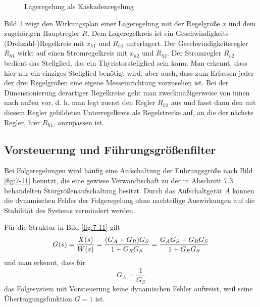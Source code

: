 \begin{figure}[ht]
    \centering
    \caption{Lageregelung als Kaskadenregelung}
    \label{fig:7-10}
\end{figure}

Bild \ref{fig:7-10} zeigt den Wirkungsplan einer Lageregelung mit der Regelgröße \(x\) und dem zugehörigen Hauptregler \(R\).
Dem Lageregelkreis ist ein Geschwindigkeits- (Drehzahl-)Regelkreis mit \(x_{h1}\) und \(R_{h1}\) unterlagert.
Der Geschwindigkeitsregler \(R_{h1}\) wirkt auf einen Stromregelkreis mit \(x_{h2}\) und \(R_{h2}\).
Der Stromregler \(R_{h2}\) bedient das Stellglied, das ein Thyristorstellglied sein kann.
Man erkennt, dass hier nur ein einziges Stellglied benötigt wird, aber auch, dass zum Erfassen jeder der drei Regelgrößen eine eigene Messeinrichtung vorzusehen ist.
Bei der Dimensionierung derartiger Regelkreise geht man zweckmäßigerweise von innen nach außen vor, d. h. man legt zuerst den Regler \(R_{h2}\) aus und fasst dann den mit diesem Regler gebildeten Unterregelkreis als Regelstrecke auf, an die der nächste Regler, hier \(R_{h1}\), anzupassen ist.


\subsection{Vorsteuerung und Führungsgrößenfilter}

Bei Folgeregelungen wird häufig eine Aufschaltung der Führungsgröße nach Bild \ref{fig:7-11} benutzt, die eine gewisse Verwandtschaft zu der in Abschnitt 7.3 behandelten Störgrößenaufschaltung besitzt.
Durch das Aufschaltgerät \(A\) können die dynamischen Fehler der Folgeregelung ohne nachteilige Auswirkungen auf die Stabilität des Systems vermindert werden.

Für die Struktur in Bild \ref{fig:7-11} gilt
\begin{equation}\label{eq:7-5}
    G\parentheses*{s} = \frac{X\parentheses*{s}}{W\parentheses*{s}} = \frac{\parentheses*{G_A + G_R}G_S}{1 + G_R G_S} = \frac{G_A G_S + G_R G_S}{1 + G_R G_S}
\end{equation}
und man erkennt, dass für
\begin{equation}
    G_A = \frac{1}{G_S}
\end{equation}
das Folgesystem mit Vorsteuerung keine dynamischen Fehler aufweist, weil seine Übertragungsfunktion \(G = 1\) ist.

